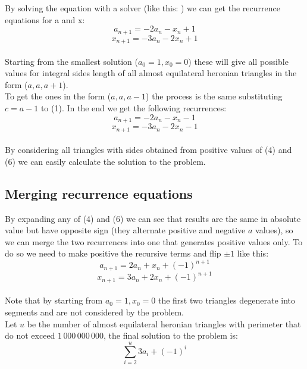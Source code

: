 \documentclass[a4paper,12pt]{article}
\begin{document}
	By solving the equation with a solver (like this: \href{https://www.alpertron.com.ar/QUAD.HTM}{\color{blue}{https://www.alpertron.com.ar\allowbreak /QUAD.HTM}}) we can get the recurrence equations for a and x:\\
	
	\begin{equation}
		a_{n+1} = -2 a_{n} -x_{n} + 1
	\end{equation}
	\begin{equation}
		x_{n+1} = -3 a_{n} -2 x_{n} + 1
	\end{equation}\\
	
	Starting from the smallest solution ($a_{0} = 1, x_{0} = 0$) these will give all possible values for integral sides length of all almost equilateral heronian triangles in the form ($a, a, a+1$).\\
	To get the ones in the form ($a, a, a-1$) the process is the same substituting $c = a - 1$ to (1). In the end we get the following recurrences:\\
	
	\begin{equation}
		a_{n+1} = -2 a_{n} -x_{n} - 1
	\end{equation}
	\begin{equation}
		x_{n+1} = -3 a_{n} -2 x_{n} - 1
	\end{equation}\\
	
	By considering all triangles with sides obtained from positive values of (4) and (6) we can easily calculate the solution to the problem.
	
	\subsection{Merging recurrence equations}
	
		By expanding any of (4) and (6) we can see that results are the same in absolute value but have opposite sign (they alternate positive and negative $a$ values), so we can merge the two recurrences into one that generates positive values only. To do so we need to make positive the recursive terms and flip $\pm 1$ like this:\\
		
		\begin{equation}
			a_{n+1} = 2 a_{n} + x_{n} + (-1)^{n+1}
		\end{equation}
		\begin{equation}
			x_{n+1} = 3 a_{n} + 2 x_{n} + (-1)^{n+1}
		\end{equation}\\
		
		Note that by starting from $a_{0} = 1, x_{0} = 0$ the first two triangles degenerate into segments and are not considered by the problem.\\
		Let $u$ be the number of almost equilateral heronian triangles with perimeter that do not exceed $1\,000\,000\,000$, the final solution to the problem is:\\
		
		\begin{equation}
			\sum_{i = 2}^{u}{3a_{i} + (-1)^{i}}
		\end{equation}
\end{document}
